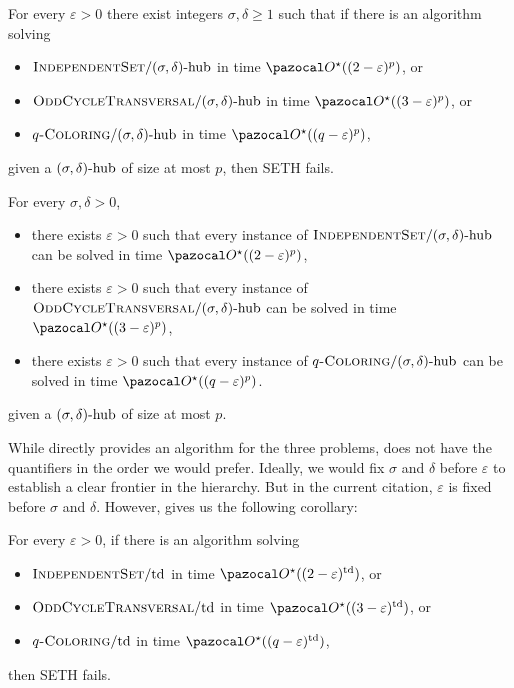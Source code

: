 \begin{theorem}
    \label{theorem:sdhub-lowerbounds}
    For every $\varepsilon > 0$ there exist integers $\sigma, \delta \geq 1$ such that if there is an algorithm solving
    \begin{itemize}
        \item $\textsc{IndependentSet}/(\sigma, \delta)\text{-hub}$ in time $\O^\star((2 - \varepsilon)^p)$, or
        \item $\textsc{OddCycleTransversal}/(\sigma, \delta)\text{-hub}$ in time $\O^\star((3 - \varepsilon)^p)$, or
        \item $q\textsc{-Coloring}/(\sigma, \delta)\text{-hub}$ in time $\O^\star((q - \varepsilon)^p)$,
    \end{itemize}
    given a $(\sigma, \delta)\text{-hub}$ of size at most $p$, then SETH fails.
\end{theorem}

\begin{theorem}
    \label{theorem:sdhub-upperbounds}
    For every $\sigma, \delta > 0$, 
    \begin{itemize}
        \item there exists $\varepsilon > 0$ such that every instance of $\textsc{IndependentSet}/(\sigma, \delta)\text{-hub}$ can be solved in time $\O^\star((2 - \varepsilon)^p)$,
        \item there exists $\varepsilon > 0$ such that every instance of $\textsc{OddCycleTransversal}/(\sigma, \delta)\text{-hub}$ can be solved in time $\O^\star((3 - \varepsilon)^p)$,
        \item there exists $\varepsilon > 0$ such that every instance of $q\textsc{-Coloring}/(\sigma, \delta)\text{-hub}$ can be solved in time $\O^\star((q - \varepsilon)^p)$.
    \end{itemize}
    given a $(\sigma, \delta)\text{-hub}$ of size at most $p$.
\end{theorem}

While  directly provides an algorithm for the three problems,  does not have the quantifiers in the order we would prefer. Ideally, we would fix $\sigma$ and $\delta$ before $\varepsilon$ to establish a clear frontier in the hierarchy. But in the current citation, $\varepsilon$ is fixed before $\sigma$ and $\delta$. However,  gives us the following corollary:

\begin{corollary}
    \label{corollary:td-lowerbounds}
    For every $\varepsilon > 0$, if there is an algorithm solving
    \begin{itemize}
        \item $\textsc{IndependentSet}/\text{td}$ in time $\O^\star((2 - \varepsilon)^\td)$, or
        \item $\textsc{OddCycleTransversal}/\text{td}$ in time $\O^\star((3 - \varepsilon)^\td)$, or
        \item $q\textsc{-Coloring}/\text{td}$ in time $\O^\star((q - \varepsilon)^\td)$,
    \end{itemize}
    then SETH fails.
\end{corollary}

